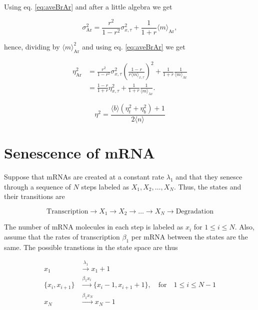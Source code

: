 Using eq. \ref{eq:aveBrAr} and after a little algebra we get

\begin{equation}
  \sigma^2_\text{Ar} = \frac{r^2}{1-r^2}\sigma^2_{x,\tau}+\frac{1}{1+r}\langle m\rangle_\text{Ar},
\end{equation}

hence, dividing by $\langle m\rangle_\text{Ar}^2$ and using eq. \ref{eq:aveBrAr} we get

\begin{equation}
  \begin{split}
    \eta^2_\text{Ar} &= \frac{r^2}{1-r^2}\sigma^2_{x,\tau}\left(\frac{1-r}{r\langle m\rangle_{x,\tau}}\right)^2+\frac{1}{1+r}\frac{1}{\langle m\rangle_\text{Ar}}\\
    &=\frac{1-r}{1+r}\eta^2_{x,\tau}+\frac{1}{1+r}\frac{1}{\langle m\rangle_\text{Ar}}.
  \end{split}
\end{equation}


\begin{equation}
  \boxed{\eta^2 = \frac{\langle b\rangle\left(\eta^2_t + \eta^2_b\right)+1}{2\langle n\rangle}}
\end{equation}


\section{Senescence of mRNA}

Suppose that mRNAs are created at a constant rate $\lambda_1$ and that they senesce through a sequence of $N$ steps labeled as $X_1,X_2,\dotsc,X_N$. Thus, the states and their transitions are

\begin{equation}
  \text{Transcription} \rightarrow X_1 \rightarrow X_2 \rightarrow \dots \rightarrow X_N \rightarrow \text{Degradation}
\end{equation}

The number of mRNA molecules in each step is labeled as $x_i$ for $1\leq i\leq N$. Also, assume that the rates of transcription $\beta_1$ per mRNA between the states are the same. The possible transtions in the state space are thus

\begin{equation}
  \begin{split}
    x_1&\xrightarrow{\lambda_1}x_1+1\\
    \{x_i,x_{i+1}\}&\xrightarrow{\beta_1x_i} \{x_i-1,x_{i+1}+1\},\quad \text{for}\quad1\leq i\leq N-1\\
    x_N&\xrightarrow{\beta_1x_N} x_N-1
  \end{split}
\end{equation}

